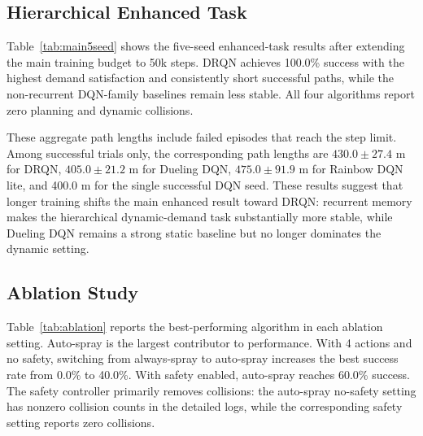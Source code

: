 \documentclass[conference,10pt]{IEEEtran}
\begin{document}
\subsection{Hierarchical Enhanced Task}
Table~\ref{tab:main5seed} shows the five-seed enhanced-task results after extending the main training budget to 50k steps. DRQN achieves 100.0\% success with the highest demand satisfaction and consistently short successful paths, while the non-recurrent DQN-family baselines remain less stable. All four algorithms report zero planning and dynamic collisions.

\begin{table}[t]
\centering
\caption{Five-seed hierarchical enhanced task results with 50k training steps.}
\label{tab:main5seed}
\end{table}

These aggregate path lengths include failed episodes that reach the step limit. Among successful trials only, the corresponding path lengths are $430.0\pm27.4$ m for DRQN, $405.0\pm21.2$ m for Dueling DQN, $475.0\pm91.9$ m for Rainbow DQN lite, and 400.0 m for the single successful DQN seed. These results suggest that longer training shifts the main enhanced result toward DRQN: recurrent memory makes the hierarchical dynamic-demand task substantially more stable, while Dueling DQN remains a strong static baseline but no longer dominates the dynamic setting.

\subsection{Ablation Study}
Table~\ref{tab:ablation} reports the best-performing algorithm in each ablation setting. Auto-spray is the largest contributor to performance. With 4 actions and no safety, switching from always-spray to auto-spray increases the best success rate from 0.0\% to 40.0\%. With safety enabled, auto-spray reaches 60.0\% success. The safety controller primarily removes collisions: the auto-spray no-safety setting has nonzero collision counts in the detailed logs, while the corresponding safety setting reports zero collisions.
\end{document}
